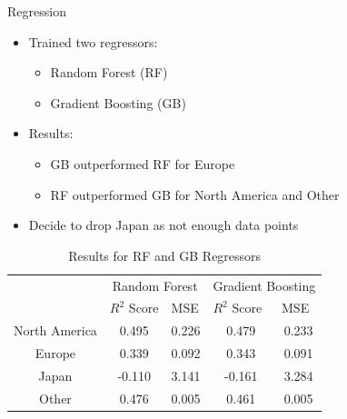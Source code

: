 \documentclass{beamer}
\begin{document}

\begin{frame}{Regression}

\begin{itemize}
    \item Trained two regressors:
    \begin{itemize}
        \item Random Forest (RF)
        \item Gradient Boosting (GB)
    \end{itemize}
    
    \vspace{3mm}
    
    \item Results:
    \begin{itemize}
        \item GB outperformed RF for Europe
        \item RF outperformed GB for North America and Other
    \end{itemize}

\vspace{3mm}

\item Decide to drop Japan as not enough data points
\end{itemize}

\begin{table}[]
\begin{tabular}{c|ccl|ccl|}
\cline{2-7}
                                    & \multicolumn{3}{c|}{Random Forest}                            & \multicolumn{3}{c|}{Gradient Boosting}                        \\ \cline{2-7} 
\multicolumn{1}{l|}{}               & \multicolumn{1}{l|}{$R^2$ Score} & \multicolumn{2}{l|}{MSE}   & \multicolumn{1}{l|}{$R^2$ Score} & \multicolumn{2}{l|}{MSE}   \\ \hline
\multicolumn{1}{|c|}{North America} & \multicolumn{1}{c|}{0.495}       & \multicolumn{2}{c|}{0.226} & \multicolumn{1}{c|}{0.479}       & \multicolumn{2}{c|}{0.233} \\ \hline
\multicolumn{1}{|c|}{Europe}        & \multicolumn{1}{c|}{0.339}       & \multicolumn{2}{c|}{0.092} & \multicolumn{1}{c|}{0.343}       & \multicolumn{2}{c|}{0.091} \\ \hline
\multicolumn{1}{|c|}{Japan}         & \multicolumn{1}{c|}{-0.110}      & \multicolumn{2}{c|}{3.141} & \multicolumn{1}{c|}{-0.161}      & \multicolumn{2}{c|}{3.284} \\ \hline
\multicolumn{1}{|c|}{Other}         & \multicolumn{1}{c|}{0.476}       & \multicolumn{2}{c|}{0.005} & \multicolumn{1}{c|}{0.461}       & \multicolumn{2}{c|}{0.005} \\ \hline
\end{tabular}
\caption{Results for RF and GB Regressors}
\end{table}

\end{frame}
\end{document}
